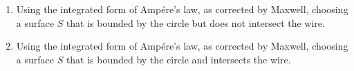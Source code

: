 \documentclass[fleqn]{article}
\begin{document}
\begin{enumerate}
\begin{enumerate}
      \item Using the integrated form of Ampére’s law, as corrected by Maxwell, choosing a surface $S$ that is 
      bounded by the circle but does not intersect the wire.

      \item Using the integrated form of Ampére’s law, as corrected by Maxwell, choosing a surface $S$ that is 
      bounded by the circle and intersects the wire.
    \end{enumerate}


  \end{enumerate}
\end{document}

